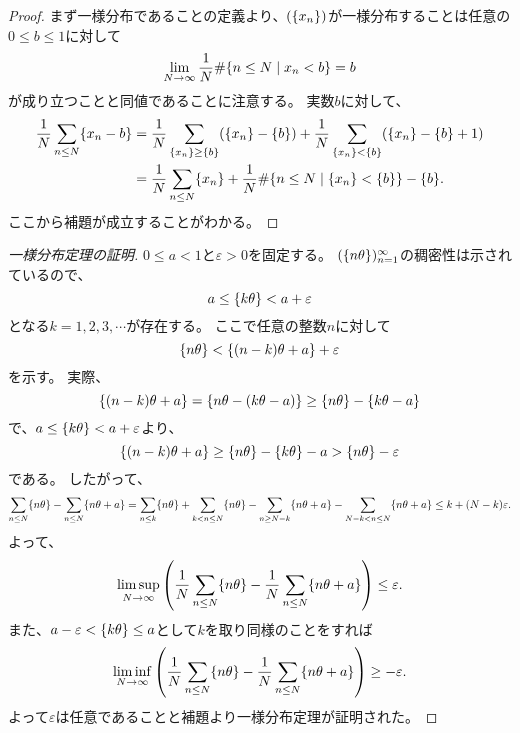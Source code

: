\begin{proof}
まず一様分布であることの定義より、$(\{x_n\})$が一様分布することは任意の$0 \le b \le 1$に対して
$$
\lim_{N \to \infty}\frac{1}{N}\#\{ n \le N \mid x_n < b \} = b
$$
が成り立つことと同値であることに注意する。
実数$b$に対して、
$$
\begin{aligned}
\frac{1}{N}\sum_{n \le N}\{x_n-b\}
&= \frac{1}{N}\sum_{\{x_n\} \ge \{b\}}(\{x_n\}-\{b\})+\frac{1}{N}\sum_{\{x_n\} < \{b\}}(\{x_n\}-\{b\}+1) \\
&= \frac{1}{N}\sum_{n \le N}\{x_n\}+\frac{1}{N}\#\{ n \le N \mid \{x_n\} < \{b\} \}-\{b\}.
\end{aligned}
$$
ここから補題が成立することがわかる。
\end{proof}

\begin{proof}[一様分布定理の証明]
$0 \le a < 1$と$\varepsilon > 0$を固定する。
$(\{n\theta\})_{n = 1}^\infty$の稠密性は示されているので、
$$
a \le \{k\theta\} < a+\varepsilon
$$
となる$k = 1, 2, 3, \cdots$が存在する。
ここで任意の整数$n$に対して
$$
\{n\theta\} < \{(n-k)\theta+a\}+\varepsilon
$$
を示す。
実際、
$$
\{(n-k)\theta+a\} = \{n\theta-(k\theta-a)\} \ge \{n\theta\}-\{k\theta-a\}
$$
で、$a \le \{k\theta\} < a+\varepsilon$より、
$$
\{(n-k)\theta+a\} \ge \{n\theta\}-\{k\theta\}-a > \{n\theta\}-\varepsilon
$$
である。
したがって、
$$
\sum_{n \le N}\{n\theta\}-\sum_{n \le N}\{n\theta+a\}
= \sum_{n \le k}\{n\theta\}+\sum_{k < n \le N}\{n\theta\}-\sum_{n \ge N-k}\{n\theta+a\}-\sum_{N-k < n \le N}\{n\theta+a\}
\le k+(N-k)\varepsilon.
$$
よって、
$$
\limsup_{N \to \infty}\qty(\frac{1}{N}\sum_{n \le N}\{n\theta\}-\frac{1}{N}\sum_{n \le N}\{n\theta+a\}) \le \varepsilon.
$$
また、$a-\varepsilon < \{k\theta\} \le a$として$k$を取り同様のことをすれば
$$
\liminf_{N \to \infty}\qty(\frac{1}{N}\sum_{n \le N}\{n\theta\}-\frac{1}{N}\sum_{n \le N}\{n\theta+a\}) \ge -\varepsilon.
$$
よって$\varepsilon$は任意であることと補題より一様分布定理が証明された。
\end{proof}
